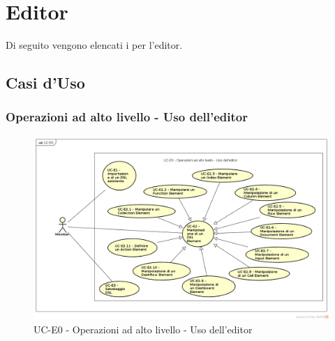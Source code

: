 \section{Editor}

Di seguito vengono elencati i  per l'editor.

\subsection{Casi d'Uso}


\subsubsection{Operazioni ad alto livello - Uso dell'editor}
    \begin{figure}[H]
      \begin{center}
        \includegraphics[width=12cm]{res/img/UCEditor/UC-E0.png}
      \caption{UC-E0 - Operazioni ad alto livello - Uso dell'editor}
      \end{center} 
    \end{figure}    
    
